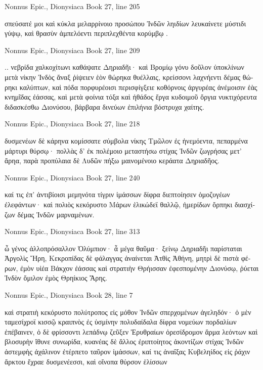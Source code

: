 \documentclass[12pt,letterpaper,twoside,final]{memoir}
\begin{document}
\begin{greek}
Nonnus Epic., Dionysiaca 
Book 27, line 205

σπεύσατέ μοι καὶ κύκλα μελαρρίνοιο προσώπου 
Ἰνδῶν ληιδίων λευκαίνετε μύστιδι γύψῳ, 
καὶ θρασὺν ἀμπελόεντι περιπλεχθέντα κορύμβῳ . 



Nonnus Epic., Dionysiaca 
Book 27, line 209

                                                    .. 
νεβρίδα χαλκοχίτωνι καθάψατε Δηριαδῆι· 
καὶ Βρομίῳ γόνυ δοῦλον ὑποκλίνων μετὰ νίκην 
Ἰνδὸς ἄναξ ῥίψειεν ἑὸν θώρηκα θυέλλαις, 
κρείσσονι λαχνήεντι δέμας θώρηκι καλύπτων, 
καὶ πόδα πορφυρέοισι περισφίγξειε κοθόρνοις 
ἀργυρέας ἀνέμοισιν ἑὰς κνημῖδας ἐάσσας, 
καὶ μετὰ φοίνια τόξα καὶ ἠθάδος ἔργα κυδοιμοῦ 
ὄργια νυκτιχόρευτα διδασκέσθω Διονύσου, 
βάρβαρα δινεύων ἐπιλήνια βόστρυχα χαίτης. 



Nonnus Epic., Dionysiaca 
Book 27, line 218

δυσμενέων δὲ κάρηνα κομίσσατε σύμβολα νίκης 
Τμῶλον ἐς ἠνεμόεντα, πεπαρμένα μάρτυρι θύρσῳ· 
πολλὰς δ' ἐκ πολέμοιο μεταστήσω στίχας Ἰνδῶν 
ζωγρήσας μετ' ἄρηα, παρὰ προπύλαια δὲ Λυδῶν 
πήξω μαινομένοιο κεράατα Δηριαδῆος. 



Nonnus Epic., Dionysiaca 
Book 27, line 240

καί τις ἐπ' ἀντιβίοισι μεμηνότα τίγριν ἱμάσσων 
δίφρα διεπτοίησεν ὁμοζυγέων ἐλεφάντων· 
καὶ πολιὸς κεκόρυστο Μάρων ἑλικώδεϊ θαλλῷ, 
ἡμερίδων ὄρπηκι διασχίζων δέμας Ἰνδῶν 
μαρναμένων. 



Nonnus Epic., Dionysiaca 
Book 27, line 313

ὦ γένος ἀλλοπρόσαλλον Ὀλύμπιον· ἆ μέγα θαῦμα· 
ξείνῳ Δηριαδῆι παρίσταται Ἀργολὶς Ἥρη, 
Κεκροπίδας δὲ φάλαγγας ἀναίνεται Ἀτθὶς Ἀθήνη, 
μητρὶ δὲ πιστὰ φέρων, ἐμὸν υἱέα Βάκχον ἐάσσας 
καὶ στρατιὴν Θρήισσαν ἐφεσπομένην Διονύσῳ, 
ῥύεται Ἰνδὸν ὅμιλον ἐμὸς Θρηίκιος Ἄρης. 



Nonnus Epic., Dionysiaca 
Book 28, line 7

καὶ στρατιὴ κεκόρυστο πολύτροπος εἰς μόθον Ἰνδῶν 
σπερχομένων ἀγεληδόν· ὁ μὲν ταμεσίχροϊ κισσῷ 
κραιπνὸς ἐς ὑσμίνην πολυδαίδαλα δίφρα νομεύων 
πορδαλίων ἐπέβαινεν, ὁ δὲ φρίσσοντι λεπάδνῳ 
ζεῦξεν Ἐρυθραίων ὀρεσίδρομον ἅρμα λεόντων 
καὶ βλοσυρὴν ἴθυνε συνωρίδα, κυανέας δὲ 
ἄλλος ἐριπτοίητος ἀκοντίζων στίχας Ἰνδῶν 
ἀστεμφὴς ἀχάλινον ἐτέρπετο ταῦρον ἱμάσσων, 
καί τις ἀναΐξας Κυβεληίδος εἰς ῥάχιν ἄρκτου 
ἔχραε δυσμενέεσσι, καὶ οἴνοπα θύρσον ἑλίσσων 





\end{greek}
\end{document}
